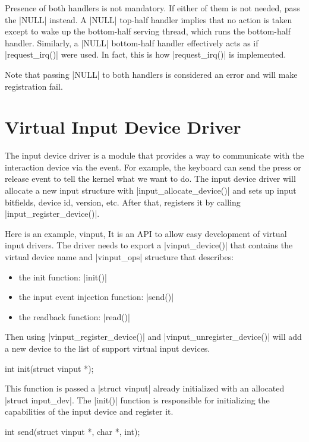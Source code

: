 \documentclass[10pt, oneside]{book}
\begin{document}
Presence of both handlers is not mandatory.
If either of them is not needed, pass the \cpp|NULL| instead.
A \cpp|NULL| top-half handler implies that no action is taken except to wake up the bottom-half serving thread, which runs the bottom-half handler.
Similarly, a \cpp|NULL| bottom-half handler effectively acts as if \cpp|request_irq()| were used.
In fact, this is how \cpp|request_irq()| is implemented.

Note that passing \cpp|NULL| to both handlers is considered an error and will make registration fail.

\section{Virtual Input Device Driver}
\label{sec:vinput}
The input device driver is a module that provides a way to communicate with the interaction device via the event.
For example, the keyboard can send the press or release event to tell the kernel what we want to do.
The input device driver will allocate a new input structure with \cpp|input_allocate_device()| and sets up input bitfields, device id, version, etc.
After that, registers it by calling \cpp|input_register_device()|.

Here is an example, vinput,
It is an API to allow easy development of virtual input drivers.
The driver needs to export a \cpp|vinput_device()| that contains the virtual device name and \cpp|vinput_ops| structure that describes:

\begin{itemize}
    \item the init function: \cpp|init()|
    \item the input event injection function: \cpp|send()|
    \item the readback function: \cpp|read()|
\end{itemize}

Then using \cpp|vinput_register_device()| and \cpp|vinput_unregister_device()| will add a new device to the list of support virtual input devices.

\begin{code}
int init(struct vinput *);
\end{code}

This function is passed a \cpp|struct vinput| already initialized with an allocated \cpp|struct input_dev|.
The \cpp|init()| function is responsible for initializing the capabilities of the input device and register it.

\begin{code}
int send(struct vinput *, char *, int);
\end{code}
\end{document}
